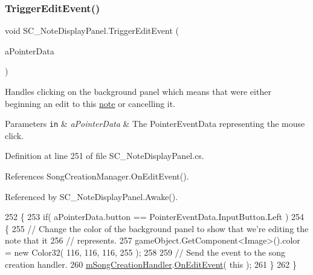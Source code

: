 \subsubsection{\texorpdfstring{Trigger\+Edit\+Event()}{TriggerEditEvent()}}
{\footnotesize\ttfamily void S\+C\+\_\+\+Note\+Display\+Panel.\+Trigger\+Edit\+Event (\begin{DoxyParamCaption}\item[{Pointer\+Event\+Data}]{a\+Pointer\+Data }\end{DoxyParamCaption})\hspace{0.3cm}{\ttfamily [private]}}



Handles clicking on the background panel which means that we\textquotesingle{}re either beginning an edit to this \hyperlink{group___music_structs_struct_music_1_1_combined_note}{note} or cancelling it. 


\begin{DoxyParams}[1]{Parameters}
\mbox{\tt in}  & {\em a\+Pointer\+Data} & The Pointer\+Event\+Data representing the mouse click. \\
\hline
\end{DoxyParams}


Definition at line 251 of file S\+C\+\_\+\+Note\+Display\+Panel.\+cs.



References Song\+Creation\+Manager.\+On\+Edit\+Event().



Referenced by S\+C\+\_\+\+Note\+Display\+Panel.\+Awake().


\begin{DoxyCode}
252     \{
253         \textcolor{keywordflow}{if}( aPointerData.button == PointerEventData.InputButton.Left )
254         \{
255             \textcolor{comment}{// Change the color of the background panel to show that we're editing the note that it }
256             \textcolor{comment}{// represents.}
257             gameObject.GetComponent<Image>().color = \textcolor{keyword}{new} Color32( 116, 116, 116, 255 );
258 
259             \textcolor{comment}{// Send the event to the song creation handler.}
260             \hyperlink{group___s_c___n_d_p_priv_var_ga5e4ae5e7daa568c3e2b471c0835600c6}{mSongCreationHandler}.\hyperlink{group___s_c_m_handlers_gacb552a4f02b22d7c10a8420eb1431201}{OnEditEvent}( \textcolor{keyword}{this} );
261         \}
262     \}
\end{DoxyCode}
